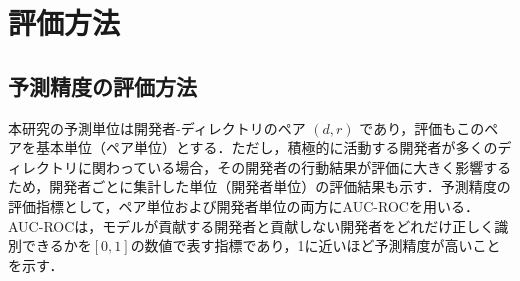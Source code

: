 \documentclass[submit,noauthor,ses,dvipdfmx]{ipsj}
\begin{document}
\section{評価方法}\label{sec:evaluation}

\subsection{予測精度の評価方法}
本研究の予測単位は開発者-ディレクトリのペア $(d, r)$ であり，評価もこのペアを基本単位（ペア単位）とする．ただし，積極的に活動する開発者が多くのディレクトリに関わっている場合，その開発者の行動結果が評価に大きく影響するため，開発者ごとに集計した単位（開発者単位）の評価結果も示す．予測精度の評価指標として，ペア単位および開発者単位の両方にAUC-ROCを用いる．AUC-ROCは，モデルが貢献する開発者と貢献しない開発者をどれだけ正しく識別できるかを$[0, 1]$の数値で表す指標であり，1に近いほど予測精度が高いことを示す．









\end{document}
